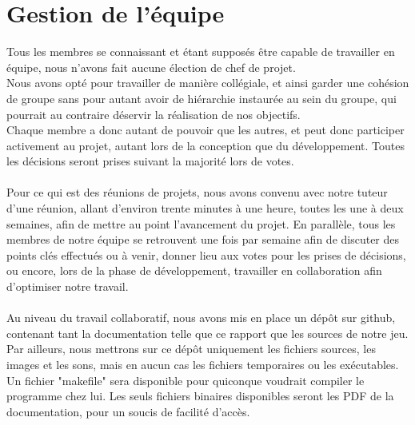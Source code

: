 \documentclass[a4paper]{memoir}
\begin{document}
		\section{Gestion de l'équipe}
			Tous les membres se connaissant et étant supposés être capable de travailler en équipe, nous n'avons fait aucune élection de chef de projet.\\
			Nous avons opté pour travailler de manière collégiale, et ainsi garder une cohésion de groupe sans pour autant avoir de hiérarchie instaurée au sein du groupe, qui pourrait au contraire déservir la réalisation de nos objectifs.\\
			Chaque membre a donc autant de pouvoir que les autres, et peut donc participer activement au projet, autant lors de la conception que du développement. Toutes les décisions seront prises suivant la majorité lors de votes.\\\\
			Pour ce qui est des réunions de projets, nous avons convenu avec notre tuteur d'une réunion, allant d'environ trente minutes à une heure, toutes les une à deux semaines, afin de mettre au point l'avancement du projet. En parallèle, tous les membres de notre équipe se retrouvent une fois par semaine afin de discuter des points clés effectués ou à venir, donner lieu aux votes pour les prises de décisions, ou encore, lors de la phase de développement, travailler en collaboration afin d'optimiser notre travail.\\\\
			Au niveau du travail collaboratif, nous avons mis en place un dépôt sur github, contenant tant la documentation telle que ce rapport que les sources de notre jeu. Par ailleurs, nous mettrons sur ce dépôt uniquement les fichiers sources, les images et les sons, mais en aucun cas les fichiers temporaires ou les exécutables. Un fichier "makefile" sera disponible pour quiconque voudrait compiler le programme chez lui. Les seuls fichiers binaires disponibles seront les PDF de la documentation, pour un soucis de facilité d'accès.
\end{document}
